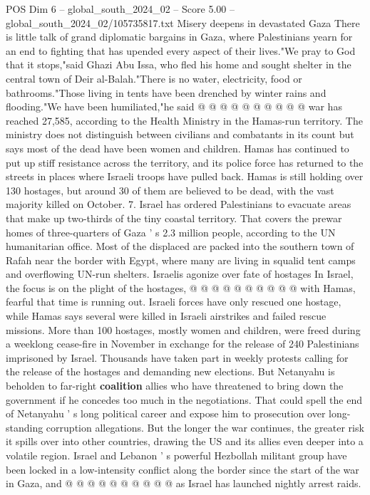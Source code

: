 \begin{textsample}{POS Dim 6 – global\_south\_2024\_02 – Score 5.00 – global\_south\_2024\_02/105735817.txt}
Misery deepens in devastated Gaza There is little talk of grand diplomatic bargains in Gaza, where Palestinians yearn for an end to fighting that has upended every aspect of their lives."We pray to God that it stops,"said Ghazi Abu Issa, who fled his home and sought shelter in the central town of Deir al-Balah."There is no water, electricity, food or bathrooms."Those living in tents have been drenched by winter rains and flooding."We have been humiliated,"he said @ @ @ @ @ @ @ @ @ @ war has reached 27,585, according to the Health Ministry in the Hamas-run territory.
The ministry does not distinguish between civilians and combatants in its count but says most of the dead have been women and children.
Hamas has continued to put up stiff resistance across the territory, and its police force has returned to the streets in places where Israeli troops have pulled back.
Hamas is still holding over 130 hostages, but around 30 of them are believed to be dead, with the vast majority killed on October. 7.
Israel has ordered Palestinians to evacuate areas that make up two-thirds of the tiny coastal territory.
That covers the prewar homes of three-quarters of Gaza ' s 2.3 million people, according to the UN humanitarian office.
Most of the displaced are packed into the southern town of Rafah near the border with Egypt, where many are living in squalid tent camps and overflowing UN-run shelters.
Israelis agonize over fate of hostages In Israel, the focus is on the plight of the hostages, @ @ @ @ @ @ @ @ @ @ with Hamas, fearful that time is running out.
Israeli forces have only rescued one hostage, while Hamas says several were killed in Israeli airstrikes and failed rescue missions.
More than 100 hostages, mostly women and children, were freed during a weeklong cease-fire in November in exchange for the release of 240 Palestinians imprisoned by Israel.
Thousands have taken part in weekly protests calling for the release of the hostages and demanding new elections.
But Netanyahu is beholden to far-right \textbf{coalition} allies who have threatened to bring down the government if he concedes too much in the negotiations.
That could spell the end of Netanyahu ' s long political career and expose him to prosecution over long-standing corruption allegations.
But the longer the war continues, the greater risk it spills over into other countries, drawing the US and its allies even deeper into a volatile region.
Israel and Lebanon ' s powerful Hezbollah militant group have been locked in a low-intensity conflict along the border since the start of the war in Gaza, and @ @ @ @ @ @ @ @ @ @ as Israel has launched nightly arrest raids.

\end{textsample}
